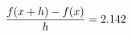 \documentclass[preview]{standalone}
\begin{document}
\begin{align*}
\special{dvisvgm:raw <g id='unique000'>}\frac{f(x+h)-f(x)}{h} = 2.142\special{dvisvgm:raw </g>}
\end{align*}
\end{document}
